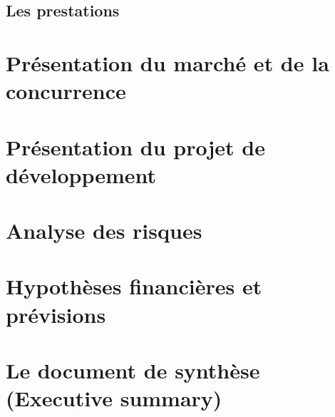 \documentclass[a4paper,12pt]{report}
\newcommand{\figpath}{figures}
\begin{document}




\subsection{Les prestations}

\section{Présentation du marché et de la concurrence}
\section{Présentation du projet de développement}
\section{Analyse des risques}
\section{Hypothèses financières et prévisions}
\section{Le document de synthèse (Executive summary)}
\end{document}
